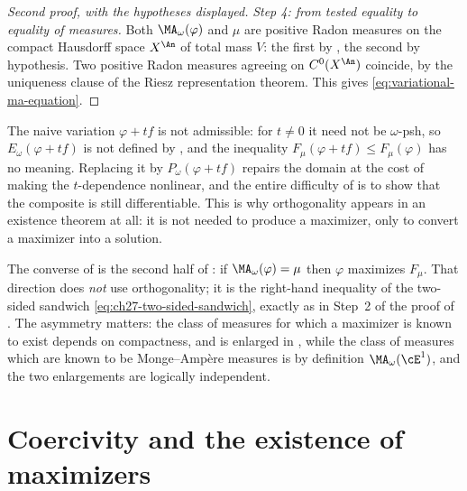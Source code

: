 \begin{proof}[Second proof, with the hypotheses displayed]
\emph{Step 4: from tested equality to equality of measures.}  Both
\(\MA_\omega(\varphi)\) and \(\mu\) are positive Radon measures on the
compact Hausdorff space \(X^{\An}\) of total mass \(V\): the first by
, the second by hypothesis.  Two positive
Radon measures agreeing on \(C^0(X^{\An})\) coincide, by the uniqueness
clause  of the Riesz representation theorem.
This gives \eqref{eq:variational-ma-equation}.
\end{proof}

\begin{remark}
\label{rem:ch28-envelope-essential}
The naive variation \(\varphi+tf\) is not admissible: for \(t\neq0\) it need
not be \(\omega\)-psh, so \(E_\omega(\varphi+tf)\) is not defined by
, and the inequality \(F_\mu(\varphi+tf)\leq
F_\mu(\varphi)\) has no meaning.  Replacing it by \(P_\omega(\varphi+tf)\)
repairs the domain at the cost of making the \(t\)-dependence nonlinear, and
the entire difficulty of  is to show that
the composite is still differentiable.  This is why orthogonality appears in
an existence theorem at all: it is not needed to produce a maximizer, only
to convert a maximizer into a solution.
\end{remark}

\begin{remark}
\label{rem:ch28-converse-direction}
The converse of  is the second half
of : if \(\MA_\omega(\varphi)=\mu\) then
\(\varphi\) maximizes \(F_\mu\).  That direction does \emph{not} use
orthogonality; it is the right-hand inequality of the two-sided sandwich
\eqref{eq:ch27-two-sided-sandwich}, exactly as in Step~2 of the proof of
.  The asymmetry matters: the class of
measures for which a maximizer is known to exist depends on compactness, and
is enlarged in , while the class of measures which
are known to be Monge--Amp\`ere measures is by definition
\(\MA_\omega(\cE^1)\), and the two enlargements are logically independent.
\end{remark}

\section{Coercivity and the existence of maximizers}
\label{sec:ch28-coercivity}

